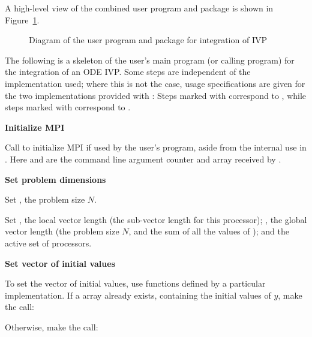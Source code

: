 A high-level view of the combined user program and {\cvode} package is
shown in Figure~\ref{f:sim_overview}.
\begin{figure}
\centerline{}
\caption {Diagram of the user program and 
  {\cvode} package for integration of IVP}\label{f:sim_overview}
\end{figure}
The following is a skeleton of the user's main program (or calling
program) for the integration of an ODE IVP. Some steps are independent
of the {\nvector} implementation used; where this is not the case, usage
specifications are given for the two implementations provided with {\cvode}:
Steps marked with {\p} correspond to  {\nvecp}, while steps marked with
{\s} correspond to {\nvecs}.
\begin{Steps}
  
\item 
  {\bf {\p} Initialize MPI}

  Call  to initialize MPI if used by
  the user's program, aside from the internal use in {\nvecp}.  
  Here  and  are the command line argument 
  counter and array received by .
  
\item
  {\bf Set problem dimensions}

  {\s} Set , the problem size $N$.

  {\p} Set , the local vector length (the sub-vector
  length for this processor); , the global vector length (the
  problem size $N$, and the sum of all the values of );
  and the active set of processors.
  
\item
  {\bf Set vector of initial values}
 
  To set the vector  of initial values, use functions defined by a
  particular {\nvector} implementation.  If a  array  
  already exists, containing the initial values of $y$, make the call:

  {\s} 

  {\p} 

  Otherwise, make the call:

  {\s} 

  {\p} 


\end{Steps}
